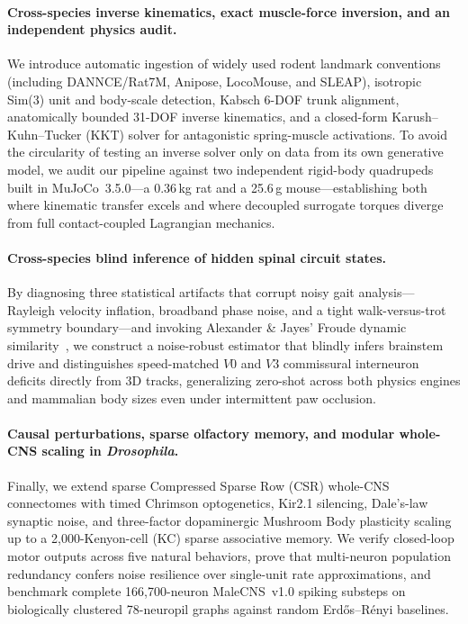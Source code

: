 \documentclass[10pt,twocolumn,letterpaper]{article}
\begin{document}
\paragraph{Cross-species inverse kinematics, exact muscle-force inversion, and an independent physics audit.}
We introduce automatic ingestion of widely used rodent landmark conventions (including DANNCE/Rat7M, Anipose, LocoMouse, and SLEAP), isotropic Sim(3) unit and body-scale detection, Kabsch 6-DOF trunk alignment, anatomically bounded 31-DOF inverse kinematics, and a closed-form Karush--Kuhn--Tucker (KKT) solver for antagonistic spring-muscle activations. To avoid the circularity of testing an inverse solver only on data from its own generative model, we audit our pipeline against two independent rigid-body quadrupeds built in MuJoCo~3.5.0---a 0.36\,kg rat and a 25.6\,g mouse---establishing both where kinematic transfer excels and where decoupled surrogate torques diverge from full contact-coupled Lagrangian mechanics.

\paragraph{Cross-species blind inference of hidden spinal circuit states.}
By diagnosing three statistical artifacts that corrupt noisy gait analysis---Rayleigh velocity inflation, broadband phase noise, and a tight walk-versus-trot symmetry boundary---and invoking Alexander \& Jayes' Froude dynamic similarity~\cite{alexander1983froude}, we construct a noise-robust estimator that blindly infers brainstem drive and distinguishes speed-matched $V0$ and $V3$ commissural interneuron deficits directly from 3D tracks, generalizing zero-shot across both physics engines and mammalian body sizes even under intermittent paw occlusion.

\paragraph{Causal perturbations, sparse olfactory memory, and modular whole-CNS scaling in \emph{Drosophila}.}
Finally, we extend sparse Compressed Sparse Row (CSR) whole-CNS connectomes with timed Chrimson optogenetics, Kir2.1 silencing, Dale's-law synaptic noise, and three-factor dopaminergic Mushroom Body plasticity scaling up to a 2,000-Kenyon-cell (KC) sparse associative memory. We verify closed-loop motor outputs across five natural behaviors, prove that multi-neuron population redundancy confers noise resilience over single-unit rate approximations, and benchmark complete 166,700-neuron MaleCNS~v1.0 spiking substeps on biologically clustered 78-neuropil graphs against random Erd\H{o}s--R\'enyi baselines.
\end{document}
